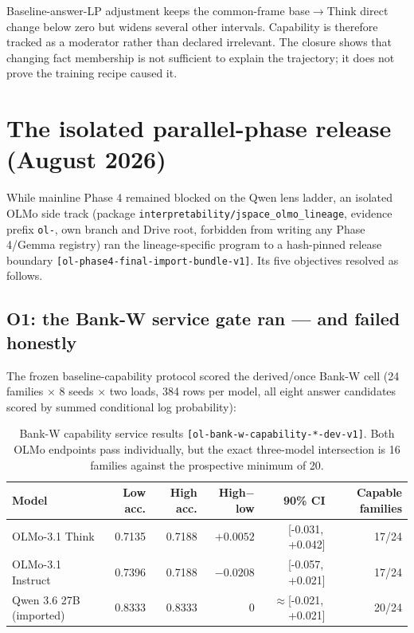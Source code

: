 \documentclass[11pt]{article}
\newcommand{\eid}[1]{{\footnotesize\nolinkurl{[#1]}}}
\newcommand{\ci}[2]{{[#1,\,#2]}}
\begin{document}
Baseline-answer-LP adjustment keeps the common-frame base$\to$Think direct
change below zero but widens several other intervals. Capability is therefore
tracked as a moderator rather than declared irrelevant. The closure shows
that changing fact membership is not sufficient to explain the trajectory;
it does not prove the training recipe caused it.

\section{The isolated parallel-phase release (August 2026)}\label{sec:parallel}

While mainline Phase 4 remained blocked on the Qwen lens ladder, an isolated
OLMo side track (package \texttt{interpretability/jspace\_olmo\_lineage},
evidence prefix \texttt{ol-}, own branch and Drive root, forbidden from
writing any Phase 4/Gemma registry) ran the lineage-specific program to a
hash-pinned release boundary \eid{ol-phase4-final-import-bundle-v1}. Its five
objectives resolved as follows.

\subsection{O1: the Bank-W service gate ran --- and failed honestly}
The frozen baseline-capability protocol scored the derived/once Bank-W cell
(24 families $\times$ 8 seeds $\times$ two loads, 384 rows per model, all
eight answer candidates scored by summed conditional log probability):

\begin{table}[H]
\centering\small
\begin{tabular}{@{}lrrrrr@{}}
\toprule
\textbf{Model} & \textbf{Low acc.} & \textbf{High acc.} & \textbf{High$-$low} & \textbf{90\% CI} & \textbf{Capable families}\\
\midrule
OLMo-3.1 Think & 0.7135 & 0.7188 & $+0.0052$ & \ci{-0.031}{+0.042} & 17/24\\
OLMo-3.1 Instruct & 0.7396 & 0.7188 & $-0.0208$ & \ci{-0.057}{+0.021} & 17/24\\
Qwen 3.6 27B (imported) & 0.8333 & 0.8333 & $0$ & $\approx$\ci{-0.021}{+0.021} & 20/24\\
\bottomrule
\end{tabular}
\caption{Bank-W capability service results
\eid{ol-bank-w-capability-*-dev-v1}. Both OLMo endpoints pass individually,
but the exact three-model intersection is 16 families against the prospective
minimum of 20.}
\label{tab:bankw-gate}
\end{table}
\end{document}
